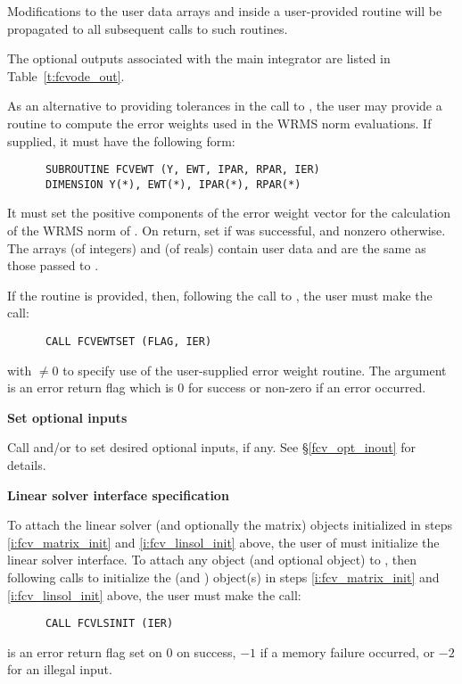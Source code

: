 \begin{Steps}
{    Modifications to the user data arrays  and  inside a 
    user-provided routine will be propagated to all subsequent calls to
    such routines.

    The optional outputs associated with the main {\cvode} integrator
    are listed in Table~\ref{t:fcvode_out}.
  }

  As an alternative to providing tolerances in the call to , the
  user may provide a routine to compute the error weights used in the WRMS norm
  evaluations. If supplied, it must have the following form:
\begin{verbatim}
      SUBROUTINE FCVEWT (Y, EWT, IPAR, RPAR, IER)
      DIMENSION Y(*), EWT(*), IPAR(*), RPAR(*)
\end{verbatim}
  It must set the positive components of the error weight vector  for
  the calculation of the WRMS norm of . On return, set
   if  was successful, and nonzero otherwise.
  The arrays  (of integers) and  (of reals) contain user data
  and are the same as those passed to .

  If the  routine is provided, then, 
  following the call to , the user must make the call:
\begin{verbatim}
      CALL FCVEWTSET (FLAG, IER)
\end{verbatim}
  with  $\neq 0$ to specify use of the user-supplied error weight routine.
  The argument  is an error return flag which is $0$ 
  for success or non-zero if an error occurred.

\item\label{i:fcv_opt_input}{\bf Set optional inputs} 

  Call  and/or  to set desired optional inputs,
  if any.  See \S\ref{fcv_opt_inout} for details.
  
\item\label{i:fcvode_lin_solv_spec} {\bf Linear solver interface specification} 
  
  To attach the linear solver (and optionally the matrix) objects
  initialized in steps \ref{i:fcv_matrix_init} and
  \ref{i:fcv_linsol_init} above, the user of {\fcvode} must initialize
  the {\cvls} linear solver interface.  To attach any {\sunlinsol}
  object (and optional {\sunmatrix} object) to {\cvode}, then following calls
  to initialize the {\sunlinsol} (and {\sunmatrix}) object(s) in steps
  \ref{i:fcv_matrix_init} and \ref{i:fcv_linsol_init} above, the user
  must make the call: 
\begin{verbatim}
      CALL FCVLSINIT (IER)
\end{verbatim}
   is an error return flag set on $0$ on success, $-1$ if a memory 
  failure occurred, or $-2$ for an illegal input.


\end{Steps}
